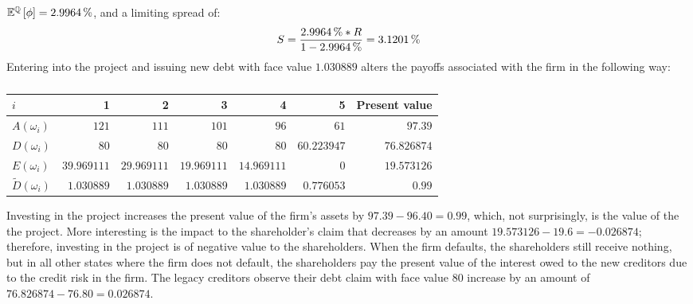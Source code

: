 \documentclass[main.tex]{subfiles}
\begin{document}
        $\mathbb{E}^{\rnmeasure}\left[\phi\right] = \pct{0.029964}$,
        and a limiting spread of:
        \begin{equation}
            S 
            = \frac{
                \pct{0.029964} * R
            }{
                \num{1} - \pct{0.029964}
            } 
            = \pct{0.031201}
        \end{equation}
        Entering into the project and issuing new debt with face value $\num{1.030889}$ 
        alters the payoffs associated with the firm in the following way:
        \begin{table}[H]
            \centering
            \begin{tabular}{l|rrrrr||r}
                $i$ & 1 & 2 & 3 & 4 & 5 & Present value \\
                \hline
                $A(\omega_{i})$ 
                    & $\num{121}$ & $\num{111}$ & $\num{101}$ & $\num{96}$ & $\num{61}$ & $\num{97.39}$ \\
                $D(\omega_{i})$ 
                    & $\num{80}$ & $\num{80}$ & $\num{80}$ & $\num{80}$ & $\num{60.223947}$ & $\num{76.826874}$ \\
                $E(\omega_{i})$ 
                    & $\num{39.969111}$ & $\num{29.969111}$ & $\num{19.969111}$ & $\num{14.969111}$ & $\num{0}$ & $\num{19.573126}$ \\
                $\tilde{D}(\omega_{i})$ 
                    & $\num{1.030889}$ & $\num{1.030889}$ & $\num{1.030889}$ & $\num{1.030889}$ & $\num{0.776053}$ & $\num{0.99}$ \\
            \end{tabular}
            \caption{}
        \end{table}

        Investing in the project increases the present value of the firm's assets by $\num{97.39} - \num{96.40} = \num{0.99}$, 
        which, not surprisingly, is the value of the the project.
        More interesting is the impact to the shareholder's claim that decreases by an amount $\num{19.573126} - \num{19.6} = \num{-0.026874}$; 
        therefore, investing in the project is of negative value to the shareholders.
        When the firm defaults, the shareholders still receive nothing, 
        but in all other states where the firm does not default, 
        the shareholders pay the present value of the interest owed to the new creditors 
        due to the credit risk in the firm.
        The legacy creditors observe their debt claim with face value $\num{80}$ increase by an amount of
        $\num{76.826874} - \num{76.80} = \num{0.026874}$.
\end{document}
